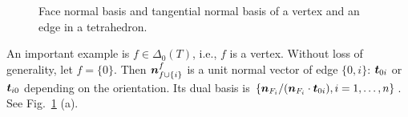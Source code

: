 \begin{figure}[htbp]
\caption{Face normal basis and tangential normal basis of a vertex and an edge in a tetrahedron.}
\label{fig:normalbasis}
\end{figure}


\begin{example}\rm
An important example is $f\in \Delta_0(T)$, i.e., $f$ is a vertex. Without loss of generality, let $f = \{0\}$. Then $\boldsymbol n_{f\cup\{i\}}^f$ is a unit normal vector of edge $\{0,i\}$: $\boldsymbol t_{0i}$ or $\boldsymbol t_{i0}$ depending on the orientation. Its dual basis is $\{\boldsymbol n_{F_i}/(\boldsymbol n_{F_i}\cdot \boldsymbol t_{0i}), i=1, \ldots, n\}$. See Fig.~\ref{fig:normalbasis} (a).
\end{example}


